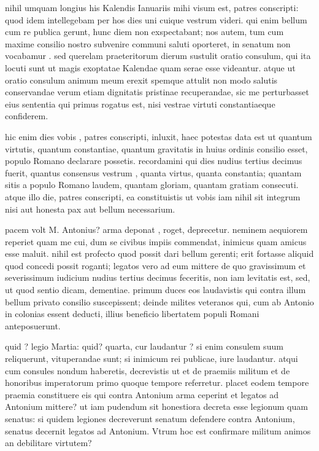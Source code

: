 
 nihil umquam longius his Kalendis Ianuariis mihi visum est, patres conscripti: quod idem intellegebam per hos dies uni cuique vestrum videri. qui enim bellum cum re publica gerunt, hunc diem non exspectabant; nos autem, tum cum maxime consilio nostro subvenire communi saluti oporteret, in senatum non vocabamur . sed querelam praeteritorum dierum sustulit oratio consulum, qui ita locuti sunt ut magis exoptatae Kalendae quam serae esse videantur. atque ut oratio consulum animum meum erexit spemque attulit non modo salutis conservandae verum etiam dignitatis pristinae recuperandae, sic me perturbasset eius sententia qui primus rogatus est, nisi vestrae virtuti constantiaeque confiderem.

 hic enim dies vobis , patres conscripti, inluxit, haec potestas data est ut quantum virtutis, quantum constantiae, quantum gravitatis in huius ordinis consilio esset, populo Romano declarare possetis. recordamini qui dies nudius tertius decimus fuerit, quantus consensus vestrum , quanta virtus, quanta constantia; quantam sitis a populo Romano laudem, quantam gloriam, quantam gratiam consecuti. atque illo die, patres conscripti, ea constituistis ut vobis iam nihil sit integrum nisi aut honesta pax aut bellum necessarium.

 pacem volt M. Antonius? arma deponat , roget, deprecetur. neminem aequiorem reperiet quam me cui, dum se civibus impiis commendat, inimicus quam amicus esse maluit. nihil est profecto quod possit dari bellum gerenti; erit fortasse aliquid quod concedi possit roganti; legatos vero ad eum mittere de quo gravissimum et severissimum iudicium nudius tertius decimus feceritis, non iam levitatis est, sed, ut quod sentio dicam, dementiae. primum duces eos laudavistis qui contra illum bellum privato consilio suscepissent; deinde milites veteranos qui, cum ab Antonio in colonias essent deducti, illius beneficio libertatem populi Romani anteposuerunt.

 quid ? legio Martia: quid? quarta, cur laudantur ? si enim consulem suum reliquerunt, vituperandae sunt; si inimicum rei publicae, iure laudantur. atqui cum consules nondum haberetis, decrevistis ut et de praemiis militum et de honoribus imperatorum primo quoque tempore referretur. placet eodem tempore praemia constituere eis qui contra Antonium arma ceperint et legatos ad Antonium mittere? ut iam pudendum sit honestiora decreta esse legionum quam senatus: si quidem legiones decreverunt senatum defendere contra Antonium, senatus decernit legatos ad Antonium. Vtrum hoc est confirmare militum animos an debilitare virtutem?

